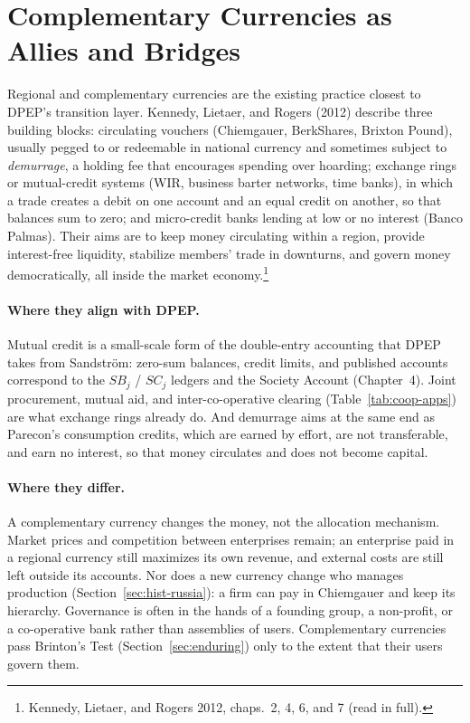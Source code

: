 \documentclass[10pt,twoside,openany]{book}
\theoremstyle{dpepstyle}
\begin{document}
\section{Complementary Currencies as Allies and Bridges}
\label{sec:complementary}

Regional and complementary currencies are the existing practice closest to DPEP's transition layer. Kennedy, Lietaer, and Rogers (2012) describe three building blocks: circulating vouchers (Chiemgauer, BerkShares, Brixton Pound), usually pegged to or redeemable in national currency and sometimes subject to \emph{demurrage}, a holding fee that encourages spending over hoarding; exchange rings or mutual-credit systems (WIR, business barter networks, time banks), in which a trade creates a debit on one account and an equal credit on another, so that balances sum to zero; and micro-credit banks lending at low or no interest (Banco Palmas). Their aims are to keep money circulating within a region, provide interest-free liquidity, stabilize members' trade in downturns, and govern money democratically, all inside the market economy.\footnote{Kennedy, Lietaer, and Rogers 2012, chaps.~2, 4, 6, and 7 (read in full).}

\paragraph{Where they align with DPEP.} Mutual credit is a small-scale form of the double-entry accounting that DPEP takes from Sandstr\"om: zero-sum balances, credit limits, and published accounts correspond to the $SB_j$ / $SC_j$ ledgers and the Society Account (Chapter~4). Joint procurement, mutual aid, and inter-co-operative clearing (Table~\ref{tab:coop-apps}) are what exchange rings already do. And demurrage aims at the same end as Parecon's consumption credits, which are earned by effort, are not transferable, and earn no interest, so that money circulates and does not become capital.

\paragraph{Where they differ.} A complementary currency changes the money, not the allocation mechanism. Market prices and competition between enterprises remain; an enterprise paid in a regional currency still maximizes its own revenue, and external costs are still left outside its accounts. Nor does a new currency change who manages production (Section~\ref{sec:hist-russia}): a firm can pay in Chiemgauer and keep its hierarchy. Governance is often in the hands of a founding group, a non-profit, or a co-operative bank rather than assemblies of users. Complementary currencies pass Brinton's Test (Section~\ref{sec:enduring}) only to the extent that their users govern them.
\end{document}
